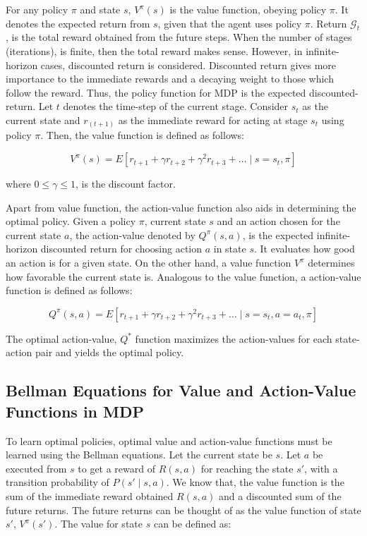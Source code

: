 For any policy \(\pi\) and state \(s\), \(V^\pi (s)\) is the value function, obeying policy \(\pi\). It denotes the expected return from \(s\), given that the agent uses policy \(\pi\). Return \(\mathcal{G}_t\), is the total reward obtained from the future steps. When the number of stages (iterations), is finite, then the total reward makes sense. However, in infinite-horizon cases, discounted return is considered. Discounted return gives more importance to the immediate rewards and a decaying weight to those which follow the reward. Thus, the policy function for MDP is the expected discounted-return. Let \(t\) denotes the time-step of the current stage. Consider \(s_t\) as the current state and \(r_(t+1)\) as the immediate reward for acting at stage \(s_t\) using policy \(\pi\). Then, the value function is defined as follows:

\begin{equation}
    V^\pi (s)=E[r_{t+1}+\gamma r_{t+2}+ \gamma^2 r_{t+3} + \dots \mid s=s_t,\pi]
\end{equation}

where \(0 \leq \gamma  \leq 1\), is the discount factor. 

Apart from value function, the action-value function also aids in determining the optimal policy.  Given a policy \(\pi\), current state \(s\) and an action chosen for the current state \(a\), the action-value denoted by \(Q^\pi (s,a)\), is the expected infinite-horizon discounted return for choosing action \(a\) in state \(s\). It evaluates how good an action is for a given state. On the other hand, a value function \(V^\pi\) determines how favorable the current state is. Analogous to the value function, a action-value function is defined as follows:

\begin{equation}
    Q^\pi (s, a)=E[r_{t+1}+\gamma r_{t+2}+ \gamma^2 r_{t+3} + \dots \mid s=s_t, a=a_t, \pi]
\end{equation}

The optimal action-value, \(Q^*\) function maximizes the action-values for each state-action pair and yields the optimal policy. 

\subsection{Bellman Equations for Value and Action-Value Functions in MDP}

To learn optimal policies, optimal value and action-value functions must be learned using the Bellman equations.  Let the current state be \(s\). Let \(a\) be executed from \(s\) to get a reward of \(R(s,a)\) for reaching the state \(s'\), with a transition probability of \(P(s' \mid s,a)\). We know that, the value function is the sum of the immediate reward obtained \(R(s,a)\) and a discounted sum of the future returns. The future returns can be thought of as the value function of state \(s'\), \(V^\pi (s')\).  The value for state \(s\) can be defined as:

